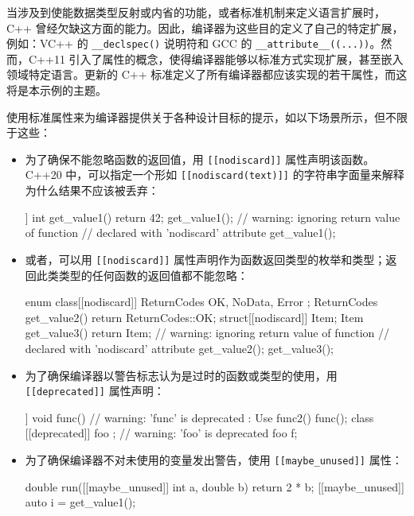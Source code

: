 

当涉及到使能数据类型反射或内省的功能，或者标准机制来定义语言扩展时，C++ 曾经欠缺这方面的能力。因此，编译器为这些目的定义了自己的特定扩展，例如：VC++ 的 \verb|__declspec()| 说明符和 GCC 的 \verb|__attribute__((...))|。然而，C++11 引入了属性的概念，使得编译器能够以标准方式实现扩展，甚至嵌入领域特定语言。更新的 C++ 标准定义了所有编译器都应该实现的若干属性，而这将是本示例的主题。



使用标准属性来为编译器提供关于各种设计目标的提示，如以下场景所示，但不限于这些：

\begin{itemize}
\item
为了确保不能忽略函数的返回值，用 \verb|[[nodiscard]]| 属性声明该函数。C++20 中，可以指定一个形如 \verb|[[nodiscard(text)]]| 的字符串字面量来解释为什么结果不应该被丢弃：

\begin{cpp}
[[nodiscard]] int get_value1()
{
    return 42;
}
get_value1();
// warning: ignoring return value of function
//          declared with 'nodiscard' attribute get_value1();
\end{cpp}

\item
或者，可以用 \verb|[[nodiscard]]| 属性声明作为函数返回类型的枚举和类型；返回此类类型的任何函数的返回值都不能忽略：

\begin{cpp}
enum class[[nodiscard]] ReturnCodes{ OK, NoData, Error };
ReturnCodes get_value2()
{
    return ReturnCodes::OK;
}
struct[[nodiscard]] Item{};
Item get_value3()
{
    return Item{};
}
// warning: ignoring return value of function
//          declared with 'nodiscard' attribute
get_value2();
get_value3();
\end{cpp}

\item
为了确保编译器以警告标志认为是过时的函数或类型的使用，用 \verb|[[deprecated]]| 属性声明：

\begin{cpp}
[[deprecated("Use func2()")]] void func()
{
}
// warning: 'func' is deprecated : Use func2()
func();
class [[deprecated]] foo
{
};
// warning: 'foo' is deprecated
foo f;
\end{cpp}

\item
为了确保编译器不对未使用的变量发出警告，使用 \verb|[[maybe_unused]]| 属性：

\begin{cpp}
double run([[maybe_unused]] int a, double b)
{
    return 2 * b;
}
[[maybe_unused]] auto i = get_value1();
\end{cpp}


\end{itemize}
